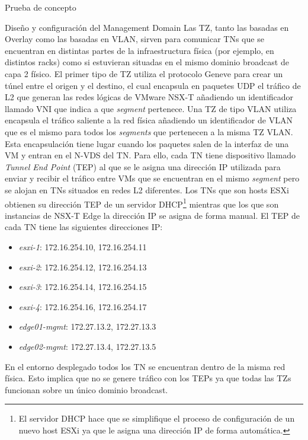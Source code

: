 \begin{section}{Prueba de concepto}
\begin{subsection}{Diseño y configuración del Management Domain}
    Las TZ, tanto las basadas en Overlay como las basadas en VLAN, sirven para comunicar TNs que se encuentran en distintas partes de la infraestructura física (por ejemplo, en distintos racks) como si estuvieran situadas en el mismo dominio broadcast de capa 2 físico. El primer tipo de TZ utiliza el protocolo Geneve para crear un túnel entre el origen y el destino, el cual encapsula en paquetes UDP el tráfico de L2 que generan las redes lógicas de VMware NSX-T añadiendo un identificador llamado VNI que indica a que \textit{segment} pertenece. Una TZ de tipo VLAN utiliza encapsula el tráfico saliente a la red física añadiendo un identificador de VLAN que es el mismo para todos los \textit{segments} que pertenecen a la misma TZ VLAN. 
    Esta encapsulación tiene lugar cuando los paquetes salen de la interfaz de una VM y entran en el N-VDS del TN. Para ello, cada TN tiene dispositivo llamado \textit{Tunnel End Point} (TEP) al que se le asigna una dirección IP utilizada para enviar y recibir el tráfico entre VMs que se encuentran en el mismo \textit{segment} pero se alojan en TNs situados en redes L2 diferentes. Los TNs que son hosts ESXi obtienen su dirección TEP de un servidor DHCP\footnote{El servidor DHCP hace que se simplifique el proceso de configuración de un nuevo host ESXi ya que le asigna una dirección IP de forma automática.} mientras que los que son instancias de NSX-T Edge la dirección IP se asigna de forma manual. El TEP de cada TN tiene las siguientes direcciones IP:
    \begin{itemize}
      \item \textit{esxi-1}: 172.16.254.10, 172.16.254.11 
      \item \textit{esxi-2}: 172.16.254.12, 172.16.254.13
      \item \textit{esxi-3}: 172.16.254.14, 172.16.254.15
      \item \textit{esxi-4}: 172.16.254.16, 172.16.254.17
      \item \textit{edge01-mgmt}: 172.27.13.2, 172.27.13.3
      \item \textit{edge02-mgmt}: 172.27.13.4, 172.27.13.5
    \end{itemize}
    En el entorno desplegado todos los TN se encuentran dentro de la misma red física. Esto implica que no se genere tráfico con los TEPs ya que todas las TZs funcionan sobre un único dominio broadcast.
    

\end{subsection}
\end{section}

